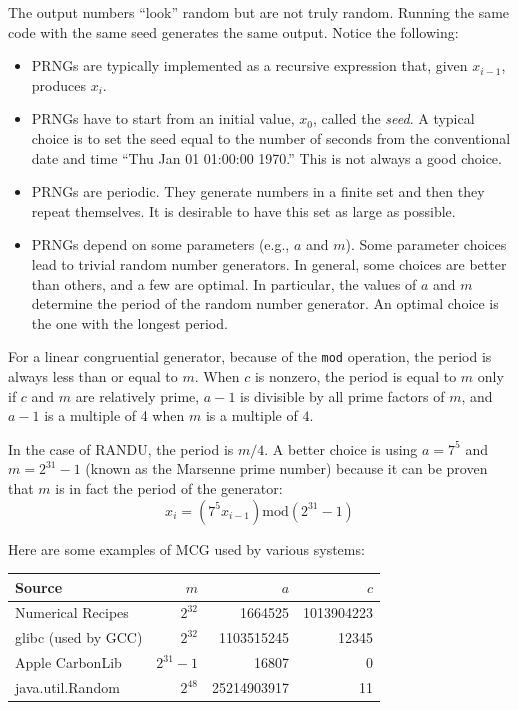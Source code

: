 \documentclass[justified,sixbynine]{tufte-book}
\def\ft{\small\tt}
\theoremstyle{plain}%
\theoremstyle{definition}
\theoremstyle{remark}
\begin{document}
\begin{fullwidth}
The output numbers ``look'' random but are not truly random. Running the same code with the same seed generates the same output. Notice the following:

\begin{itemize}
\item  PRNGs are typically implemented as a recursive expression that, given $%
x_{i-1}$, produces $x_i$.



\item  PRNGs have to start from an initial value, $x_0$, called the {\it seed}.
A typical choice is to set the seed equal to the number of seconds from the
conventional date and time ``Thu Jan 01 01:00:00 1970.'' This is not always
a good choice.

\item PRNGs are periodic. They generate numbers in a finite set and then they repeat themselves. It is desirable to have this set as large as possible.

\item  PRNGs depend on some parameters (e.g., $a$ and $m$). Some
parameter choices lead to trivial random number generators. In
general, some choices are better than others, and a few are optimal. In
particular, the values of $a$ and $m$ determine the period of the random
number generator. An optimal choice is the one with the longest period.
\end{itemize}

For a linear congruential generator, because of the {\ft mod} operation, the period is always less than or equal to $m$. When $c$ is nonzero, the period is equal to $m$ only if $c$ and $m$ are relatively prime, $a-1$ is divisible by all prime factors of $m$, and $a-1$ is a multiple of 4 when $m$ is a multiple of $4$.

In the case of RANDU, the period is $m/4$. A better choice is using $a=7^5$ and $m=2^{31}-1$ (known as the Marsenne prime number) because it can be proven that $m$ is in fact the period of the generator:
\begin{equation}
x_i=(7^5x_{i-1})\textrm{mod}(2^{31}-1)  \label{Marsenne}
\end{equation}

Here are some examples of MCG used by various systems:

\begin{tabular}{|lrrr|} \hline
Source & $m$ & $a$ & $c$ \\ \hline
Numerical Recipes & $2^{32}$ & 1664525 & 1013904223 \\
glibc (used by GCC) & $2^{32}$ & 1103515245 & 12345 \\
Apple CarbonLib & $2^{31} - 1$ & 16807 & 0 \\
java.util.Random & $2^{48}$ & 25214903917 & 11 \\ \hline
\end{tabular}


\end{fullwidth}
\end{document}

